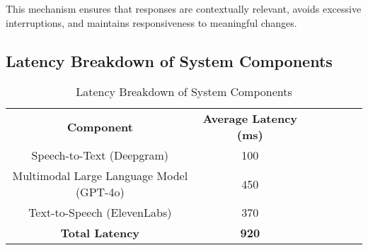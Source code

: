 This mechanism ensures that responses are contextually relevant, avoids excessive interruptions, and maintains responsiveness to meaningful changes.


\subsection{Latency Breakdown of System Components}
\begin{table}[h]
\begin{tabular}{@{}ccccccc@{}}
\toprule
\textbf{Component}          & \textbf{Average Latency (ms)} \\
Speech-to-Text (Deepgram)   & 100                           \\
Multimodal Large Language Model (GPT-4o) & 450                   \\ 
Text-to-Speech (ElevenLabs) & 370                           \\
\textbf{Total Latency}      & \textbf{920}                 \\
\bottomrule
\end{tabular}
\caption{Latency Breakdown of System Components }
\label{tab:latency}
\vspace{-18px}
\end{table}





% 
